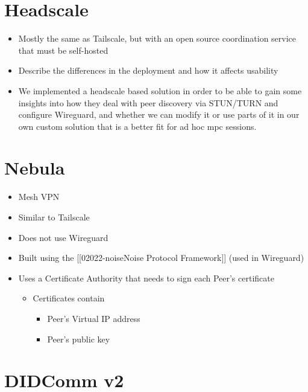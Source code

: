 \hypertarget{headscale}{%
\section{Headscale}\label{headscale}}

\begin{itemize}
\tightlist
\item
  Mostly the same as Tailscale, but with an open source coordination
  service that must be self-hosted
\item
  Describe the differences in the deployment and how it affects
  usability
\item
  We implemented a headscale based solution in order to be able to gain
  some insights into how they deal with peer discovery via STUN/TURN and
  configure Wireguard, and whether we can modify it or use parts of it
  in our own custom solution that is a better fit for ad hoc mpc
  sessions.
\end{itemize}

\hypertarget{nebula}{%
\section{Nebula}\label{nebula}}

\begin{itemize}
\tightlist
\item
  Mesh VPN
\item
  Similar to Tailscale
\item
  Does not use Wireguard
\item
  Built using the {[}{[}02022-noise\textbar Noise Protocol
  Framework{]}{]} (used in Wireguard)
\item
  Uses a Certificate Authority that needs to sign each Peer's
  certificate

  \begin{itemize}
  \tightlist
  \item
    Certificates contain

    \begin{itemize}
    \tightlist
    \item
      Peer's Virtual IP address
    \item
      Peer's public key
    \end{itemize}
  \end{itemize}
\end{itemize}

\hypertarget{didcomm-v2}{%
\section{DIDComm v2}\label{didcomm-v2}}

